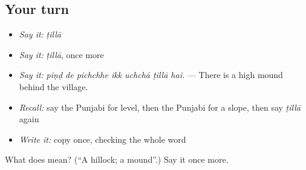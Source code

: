 \subsection*{Your turn}
\begin{itemize}
\raggedright
  \item \emph{Say it:} \emph{ṭillā}
  \item \emph{Say it:} \emph{ṭillā}, once more
  \item \emph{Say it:} \emph{piṇḍ de pichchhe ikk uchchā ṭillā hai.} — There is a high mound behind the village.
  \item \emph{Recall:} say the Punjabi for level, then the Punjabi for a slope, then say \emph{ṭillā} again
  \item \emph{Write it:} copy \textbf{} once, checking the whole word
\end{itemize}

\begin{tcolorbox}[breakable,colback=teal!4,colframe=teal!35!black,title={Before you move on}]
What does  mean? (\textquotedblleft{}A hillock; a mound\textquotedblright{}.) Say it once more.
\end{tcolorbox}
